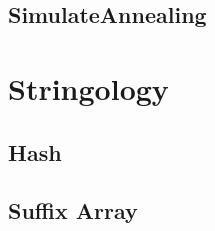 \documentclass[a4paper,10pt,twocolumn,oneside]{article}
\begin{document}
\subsection{SimulateAnnealing}


%

%

%

%

%

\section{Stringology}

\subsection{Hash}


\subsection{Suffix Array}


%
\end{document}
